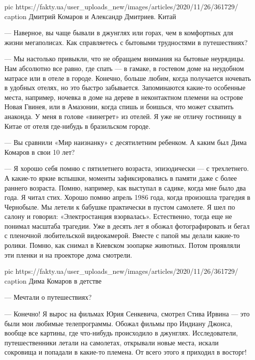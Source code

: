 \ifcmt
pic https://fakty.ua/user_uploads_new/images/articles/2020/11/26/361729/%
caption Дмитрий Комаров и Александр Дмитриев. Китай
\fi

— Наверное, вы чаще бывали в джунглях или горах, чем в комфортных для
жизни мегаполисах. Как справляетесь с бытовыми трудностями в путешествиях?

— Мы настолько привыкли, что не обращаем внимания на бытовые неурядицы.
Нам абсолютно все равно, где спать — в гамаке, в гостевом доме
на неудобном матрасе или в отеле в городе. Конечно, больше любим, когда
получается ночевать в удобных отелях, но это быстро забывается.
Запоминаются какие-то особенные места, например, ночевка в доме на дереве
в неконтактном племени на острове Новая Гвинея, или в Амазонии, когда
спишь и боишься, что может схватить анаконда. У меня в голове «винегрет»
из отелей. Я уже не отличу гостиницу в Китае от отеля где-нибудь
в бразильском городе.

— Вы сравнили «Мир наизнанку» с десятилетним ребенком. А каким был Дима
Комаров в свои 10 лет?

— Я хорошо себя помню с пятилетнего возраста, эпизодически —
с трехлетнего. А какие-то яркие вспышки, моменты зафиксировались в памяти
даже с более раннего возраста. Помню, например, как выступал в садике,
когда мне было два года. Я читал стих. Хорошо помню апрель 1986 года,
когда произошла трагедия в Чернобыле. Мы летели к бабушке практически
в пустом самолете. Я шел по салону и говорил: «Электростанция взорвалась».
Естественно, тогда еще не понимал масштаба трагедии. Уже в десять лет
я обожал фотографировать и бегал с пленочной любительской видеокамерой.
Вместе с папой мы делали какие-то ролики. Помню, как снимал в Киевском
зоопарке животных. Потом проявляли эти пленки и на проекторе дома
смотрели.

\ifcmt
pic https://fakty.ua/user_uploads_new/images/articles/2020/11/26/361729/%
caption  Дима Комаров в детстве
\fi

— Мечтали о путешествиях?

— Конечно! Я вырос на фильмах Юрия Сенкевича, смотрел Стива Ирвина — это
были мои любимые телепрограммы. Обожал фильмы про Индиану Джонса, вообще
все картины, где что-нибудь происходило в джунглях. Исследователи,
путешественники летали на самолетах, открывали новые места, искали
сокровища и попадали в какие-то племена. От всего этого я приходил
в восторг!

